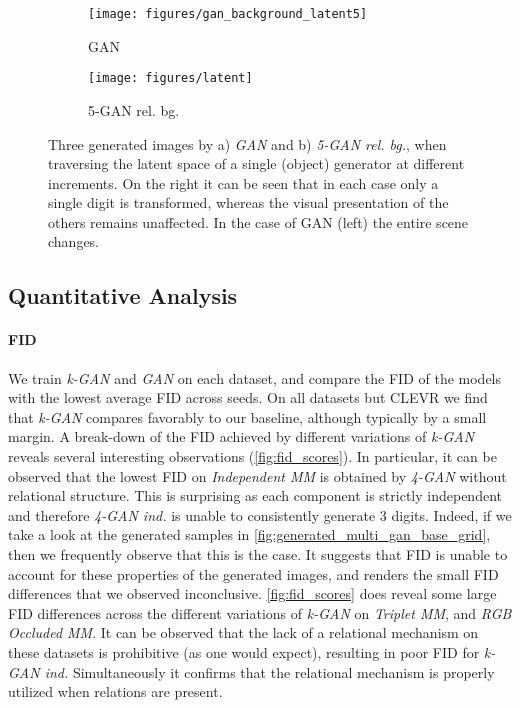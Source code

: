 \documentclass{article}
\begin{document}
\begin{figure}
\begin{subfigure}{.5\textwidth}
  \centering
  \texttt{[image: figures/gan\_background\_latent5]}
  \caption{GAN}
  \label{fig:latent_gan}
\end{subfigure}%
\begin{subfigure}{.5\textwidth}
  \centering
  \texttt{[image: figures/latent]}
  \caption{5-GAN rel. bg.}
  \label{fig:latent_multiganbackground}
\end{subfigure}
\caption{Three generated images by a) \emph{GAN} and b) \emph{5-GAN rel. bg.}, when traversing the latent space of a single (object) generator at different increments. On the right it can be seen that in each case only a single digit is transformed, whereas the visual presentation of the others remains unaffected.
In the case of GAN (left) the entire scene changes.}
\label{fig:relational}
\end{figure}\subsection{Quantitative Analysis}\label{subsection:comparison}\paragraph{FID}
We train \emph{k-GAN} and \emph{GAN} on each dataset, and compare the FID of the models with the lowest average FID across seeds.
On all datasets but CLEVR we find that \emph{k-GAN} compares favorably to our baseline, although typically by a small margin.
A break-down of the FID achieved by different variations of \emph{k-GAN} reveals several interesting observations (\autoref{fig:fid_scores}).
In particular, it can be observed that the lowest FID on \emph{Independent MM} is obtained by \emph{4-GAN} without relational structure.
This is surprising as each component is strictly independent and therefore \emph{4-GAN ind.} is unable to consistently generate 3 digits.
Indeed, if we take a look at the generated samples in \autoref{fig:generated_multi_gan_base_grid}, then we frequently observe that this is the case.
It suggests that FID is unable to account for these properties of the generated images, and renders the small FID differences that we observed inconclusive.
\autoref{fig:fid_scores} does reveal some large FID differences across the different variations of \emph{k-GAN} on \emph{Triplet MM}, and \emph{RGB Occluded MM}.
It can be observed that the lack of a relational mechanism on these datasets is prohibitive (as one would expect), resulting in poor FID for \emph{k-GAN ind.}
Simultaneously it confirms that the relational mechanism is properly utilized when relations are present.
\end{document}
